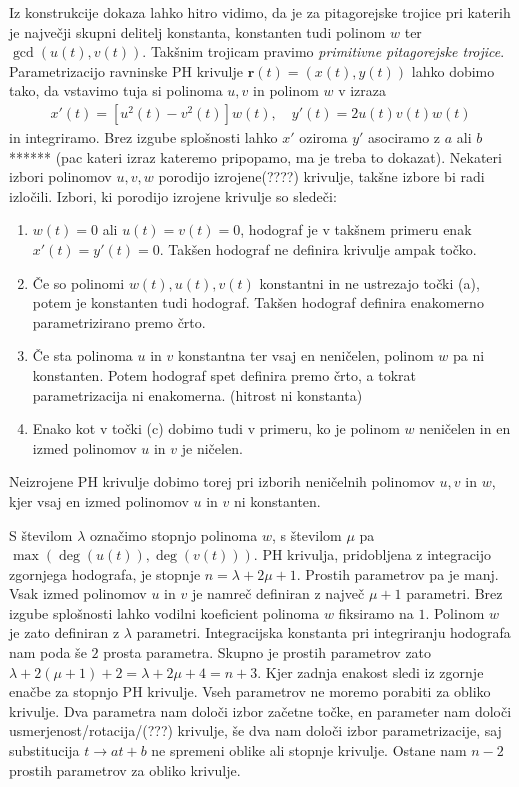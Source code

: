 \documentclass[isrm2, tisk]{fmfdelo}
\begin{document}
    Iz konstrukcije dokaza lahko hitro vidimo, da je za pitagorejske trojice pri katerih je največji skupni delitelj konstanta, konstanten tudi polinom $w$ ter $\gcd(u(t),v(t))$.
    Takšnim trojicam pravimo \textit{primitivne pitagorejske trojice}.
    Parametrizacijo ravninske PH krivulje $\mathbf{r}(t)=(x(t),y(t))$ lahko dobimo tako, da vstavimo tuja si polinoma $u,v$ in polinom $w$ v izraza
    \begin{align}
        x'(t)=[u^2(t)-v^2(t)]w(t),\quad y'(t)=2u(t)v(t)w(t)  \label{eq:hodograf-splosni}
    \end{align} in integriramo.
    Brez izgube splošnosti lahko $x'$ oziroma $y'$ asociramo z $a$ ali $b$****** (pac kateri izraz kateremo pripopamo, ma je treba to dokazat).
    Nekateri izbori polinomov $u,v,w$ porodijo izrojene(????) krivulje, takšne izbore bi radi izločili.
    Izbori, ki porodijo izrojene krivulje so sledeči:
    \vspace{-0.3cm}
    \begin{enumerate}
        \itemsep0em
        \item $w(t)=0$ ali $u(t)=v(t)=0$, hodograf je v takšnem primeru enak $x'(t)=y'(t)=0$.
        Takšen hodograf ne definira krivulje ampak točko.
        \item  Če so polinomi $w(t),u(t),v(t)$ konstantni in ne ustrezajo točki (a), potem je konstanten tudi hodograf.
        Takšen hodograf definira enakomerno parametrizirano premo črto.
        \item  Če sta polinoma $u$ in $v$ konstantna ter vsaj en neničelen, polinom $w$ pa ni konstanten.
        Potem hodograf spet definira premo črto, a tokrat parametrizacija ni enakomerna. (hitrost ni konstanta)
        \item Enako kot v točki (c) dobimo tudi v primeru, ko je polinom $w$ neničelen in en izmed polinomov $u$ in $v$ je ničelen.
    \end{enumerate}
    \vspace{-0.3cm}
    \noindent Neizrojene PH krivulje dobimo torej pri izborih neničelnih polinomov $u,v$ in $w$, kjer vsaj en izmed polinomov $u$ in $v$ ni konstanten.

    S številom $\lambda$ označimo stopnjo polinoma $w$, s številom $\mu$ pa $\max(\deg(u(t)),\deg(v(t)))$.
    PH krivulja, pridobljena z integracijo zgornjega hodografa, je stopnje $n=\lambda + 2\mu + 1$.
    Prostih parametrov pa je manj.
    Vsak izmed polinomov $u$ in $v$ je namreč definiran z največ $\mu + 1$ parametri.
    Brez izgube splošnosti lahko vodilni koeficient polinoma $w$ fiksiramo na $1$.
    Polinom $w$ je zato definiran z $\lambda$ parametri.
    Integracijska konstanta pri integriranju hodografa nam poda še $2$ prosta parametra.
    Skupno je prostih parametrov zato $\lambda + 2(\mu+1)+2=\lambda + 2\mu+4 = n+3$.
    Kjer zadnja enakost sledi iz zgornje enačbe za stopnjo PH krivulje.
    Vseh parametrov ne moremo porabiti za obliko krivulje.
    Dva parametra nam določi izbor začetne točke, en parameter nam določi usmerjenost/rotacija/(???) krivulje, še dva nam določi izbor parametrizacije, saj substitucija $t\to at+b$ ne spremeni oblike ali stopnje krivulje.
    Ostane nam $n-2$ prostih parametrov za obliko krivulje.
\end{document}
